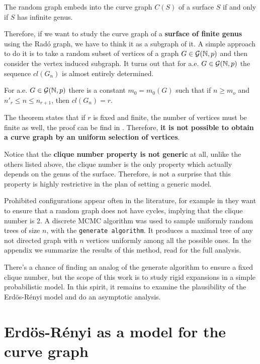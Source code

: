 \begin{theorem}\label{beringAndGaster}
The random graph embeds into the curve graph $C(S)$ of a surface $S$ if and only if $S$ has infinite genus.
\end{theorem}

Therefore, if we want to study the curve graph of a \textbf{surface of finite genus} using the Radó graph, we have to think it as a subgraph of it. A simple approach to do it is to take a random subset of vertices of a graph $G\in \mathcal{G}(\mathbb{N}, p)$ and then consider the vertex induced subgraph. It turns out that for a.e. $G\in \mathcal{G}(\mathbb{N}, p)$ the sequence $cl(G_n)$ is almost entirely determined.

\begin{theorem}
For a.e. $G \in \mathcal{G}(\mathbb{N},p)$ there is a constant $m_0 = m_{0}(G)$ such that if $n \geq m_o$ and $n'_{r} \leq n \leq n_{r+1}$, then $cl(G_{n}) = r$.
\end{theorem}

The theorem states that if $r$ is fixed and finite, the number of vertices must be finite as well, the proof can be find in \cite[Bollobás p.~284]{Bollobas}. Therefore, \textbf{it is not possible to obtain a curve graph by an uniform selection of vertices}.

Notice that the \textbf{clique number property is not generic} at all, unlike the others listed above, the clique number is the only property which actually depends on the genus of the surface. Therefore, is not a surprise that this property is highly restrictive in the plan of setting a generic model.

Prohibited configurations appear often in the literature, for example in \cite[Alcazar 15]{Alcazar15} they want to ensure that a random graph does not have cycles, implying that the clique number is 2. A discrete MCMC algorithm was used to sample uniformly random trees of size $n$, with the \texttt{generate algorithm}. It produces a maximal tree of any not directed graph with $n$ vertices uniformly among all the possible ones. In the appendix we summarize the results of this method, read \cite[Broder 89]{Broder89} for the full analysis.

There's a chance of finding an analog of the generate algorithm to ensure a fixed clique number, but the scope of this work is to study rigid expansions in a simple probabilistic model. In this spirit, it remains to examine the plausibility of the Erdös-Rényi model and do an asymptotic analysis.

\section{Erdös-Rényi as a model for the curve graph}

